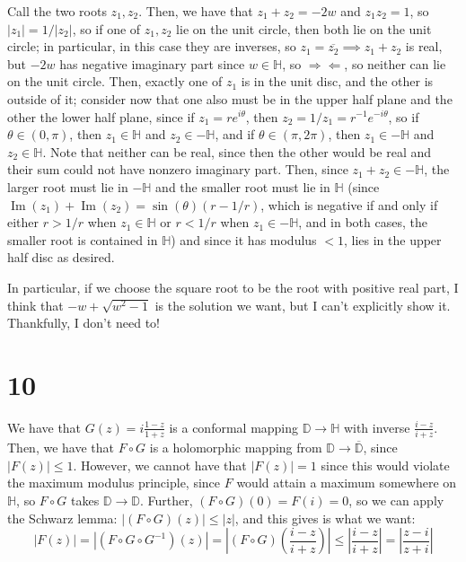 \documentclass[12pt,letterpaper]{article}
\theoremstyle{definition}
\newcommand{\contra}{\Rightarrow\!\Leftarrow}
\newcommand{\D}{\mathbb{D}}
\newcommand{\Ha}{\mathbb{H}}
\DeclareMathOperator{\imag}{Im}
\begin{document}
Call the two roots $z_{1}, z_{2}$. Then, we have that $z_{1} + z_{2} = -2w$ and $z_{1}z_{2} = 1$, so $|z_{1}| = 1/|z_{2}|$, so if one of $z_{1}, z_{2}$ lie on the unit circle, then both lie on the unit circle; in particular, in this case they are inverses, so $z_{1} = \overline{z_{2}} \implies z_{1} + z_{2}$ is real, but $-2w$ has negative imaginary part since $w \in \Ha$, so $\contra$, so neither can lie on the unit circle. Then, exactly one of $z_{1}$ is in the unit disc, and the other is outside of it; consider now that one also must be in the upper half plane and the other the lower half plane, since if $z_{1} = re^{i\theta}$, then $z_{2} = 1/z_{1} = r^{-1}e^{-i\theta}$, so if $\theta \in (0,\pi)$, then $z_{1} \in \Ha$ and $z_{2} \in -\Ha$, and if $\theta \in (\pi, 2\pi)$, then $z_{1} \in -\Ha$ and $z_{2} \in \Ha$. Note that neither can be real, since then the other would be real and their sum could not have nonzero imaginary part. Then, since $z_{1} + z_{2} \in -\Ha$, the larger root must lie in $-\Ha$ and the smaller root must lie in $\Ha$ (since $\imag(z_{1}) + \imag(z_{2}) = \sin(\theta)(r - 1/r)$, which is negative if and only if either $r > 1/r$ when $z_{1} \in \Ha$ or $r < 1/r$ when $z_{1} \in -\Ha$, and in both cases, the smaller root is contained in $\Ha$) and since it has modulus $< 1$, lies in the upper half disc as desired.

In particular, if we choose the square root to be the root with positive real part, I think that $-w + \sqrt{w^{2} - 1}$ is the solution we want, but I can't explicitly show it. Thankfully, I don't need to!

\section*{10}

We have that $G(z) = i\frac{1 - z}{1 + z}$ is a conformal mapping $\D \rightarrow \Ha$ with inverse $\frac{i - z}{i + z}$. Then, we have that $F \circ G$ is a holomorphic mapping from $\D \rightarrow \overline{\D}$, since $|F(z)| \leq 1$. However, we cannot have that $|F(z)| = 1$ since this would violate the maximum modulus principle, since $F$ would attain a maximum somewhere on $\Ha$, so $F \circ G$ takes $\D \rightarrow \D$. Further, $(F \circ G)(0) = F(i) = 0$, so we can apply the Schwarz lemma: $|(F \circ G)(z)| \leq |z|$, and this gives is what we want:
\[
  |F(z)| = |(F \circ G \circ G^{-1})(z)| = \left|(F \circ G)\left(\frac{i - z}{i + z}\right)\right| \leq \left|\frac{i - z}{i + z}\right| = \left|\frac{z - i}{z + i}\right|
\]
\end{document}
